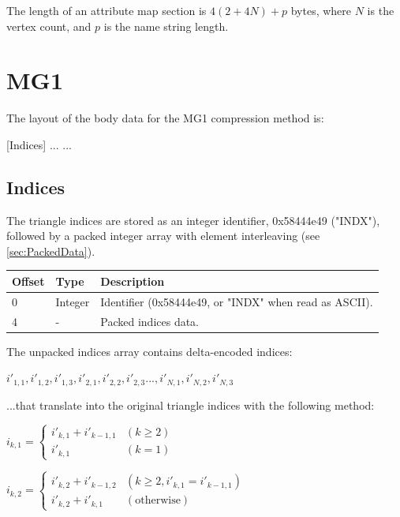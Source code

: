 The length of an attribute map section is $4(2+4N)+p$ bytes, where $N$ is the vertex
count, and $p$ is the name string length.


\section{MG1}
The layout of the body data for the MG1 compression method is:

[Indices]\newline
[Vertices]\newline
[Normals]\newline
[UV map 0]\newline
[UV map 1]\newline
...\newline
[UV map N]\newline
...

\subsection{Indices}
\label{sec:MG1Indices}
The triangle indices are stored as an integer identifier, 0x58444e49 ("INDX"),
followed by a packed integer array with element interleaving (see
\ref{sec:PackedData}).

\begin{tabular}{|l|l|l|}\hline
\textbf{Offset} &  \textbf{Type} & \textbf{Description}\\ \hline
0 & Integer & Identifier (0x58444e49, or "INDX" when read as ASCII).\\ \hline
4 & - & Packed indices data.\\ \hline
\end{tabular}

The unpacked indices array contains delta-encoded indices:

$i'_{1,1}, i'_{1,2}, i'_{1,3}, i'_{2,1}, i'_{2,2}, i'_{2,3} ..., i'_{N,1}, i'_{N,2}, i'_{N,3}$

...that translate into the original triangle indices with the following method:

$i_{k,1} = \begin{cases}
i'_{k,1} + i'_{k-1,1}  & (k \geq 2) \\
i'_{k,1} & (k = 1)
\end{cases}$

$i_{k,2} = \begin{cases}
i'_{k,2} + i'_{k-1,2}  & (k \geq 2, i'_{k,1} = i'_{k-1,1}) \\
i'_{k,2} + i'_{k,1} &  (\text{otherwise})
\end{cases}$

